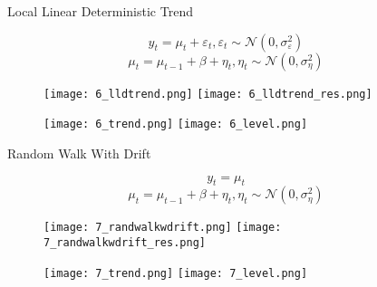 \documentclass{beamer}
\begin{document}
\begin{frame}[fragile]
\begin{columns}[T]
\begin{column}{.32\textwidth}
\end{column}

\begin{column}{.32\textwidth}

\begin{block}{Local Linear Deterministic Trend}

\vspace{-0.25cm}

\[
y_t = \mu_t + \varepsilon_t, \varepsilon_t \sim \mathcal{N}(0, \sigma^2_\varepsilon)
\]
\[
\mu_t = \mu_{t-1} + \beta + \eta_t, \eta_t \sim \mathcal{N}(0, \sigma^2_\eta)
\]

\begin{figure}[htb]
  \texttt{[image: 6\_lldtrend.png]}
\endminipage\hfill
{}
  \texttt{[image: 6\_lldtrend\_res.png]}
\endminipage\hfill
\end{figure}

\begin{figure}[htb]
  \texttt{[image: 6\_trend.png]}
\endminipage\hfill
{}
  \texttt{[image: 6\_level.png]}
\endminipage\hfill
\end{figure}
\end{block}

\begin{block}{Random Walk With Drift}

\vspace{-0.25cm}

\[
y_t = \mu_t 
\]
\[
\mu_t = \mu_{t-1} + \beta + \eta_t, \eta_t \sim \mathcal{N} (0, \sigma_\eta^2)
\]

\begin{figure}[htb]
  \texttt{[image: 7\_randwalkwdrift.png]}
\endminipage\hfill
{}
  \texttt{[image: 7\_randwalkwdrift\_res.png]}
\endminipage\hfill
\end{figure}

\begin{figure}[htb]
  \texttt{[image: 7\_trend.png]}
\endminipage\hfill
{}
  \texttt{[image: 7\_level.png]}
\endminipage\hfill
\end{figure}
\end{block}

\begin{columns}[T]
\begin{column}{.49\textwidth}


\end{column}
\end{columns}
\end{column}
\end{columns}
\end{frame}
\end{document}
